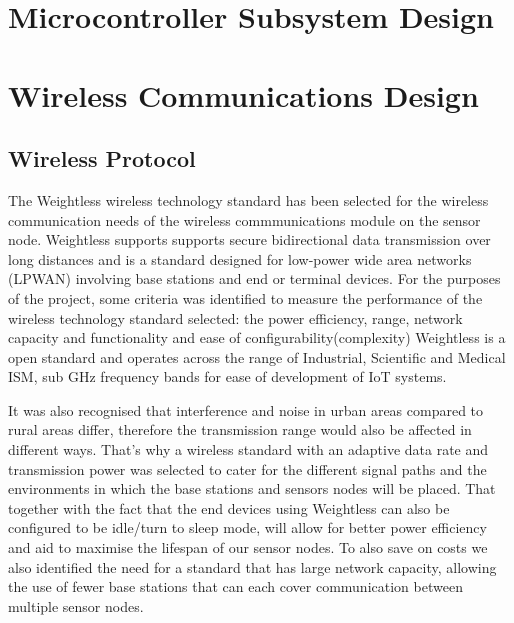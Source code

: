 \documentclass[12pt]{article}
\begin{document}
\section{Microcontroller Subsystem Design}

\section{Wireless Communications Design}

\subsection{Wireless Protocol}

The Weightless wireless technology standard has been selected for the wireless communication needs of the wireless commmunications module on the sensor node. Weightless supports supports secure bidirectional data transmission over long distances and is a standard designed for low-power wide area networks (LPWAN) involving base stations and end or terminal devices. For the purposes of the project, some criteria was identified to measure the performance of the wireless technology standard selected: the power efficiency, range, network capacity and  functionality and ease of configurability(complexity) Weightless is a open standard and operates across the range of Industrial, Scientific and Medical ISM, sub GHz  frequency bands for ease of development of IoT systems. 

It was also recognised that interference and noise in urban areas compared to rural areas differ, therefore the transmission range would also be affected in different ways. That's why a wireless standard with an adaptive data rate and transmission power was selected to cater for the different signal paths and the environments in which the base stations and sensors nodes will be placed. That together with the fact that the end devices using Weightless can also be configured to be idle/turn to sleep mode, will allow for better power efficiency and aid to maximise the lifespan of our sensor nodes. 
To also save on costs we also identified the need for a standard that has large network capacity, allowing the use of fewer base stations that can each cover communication between multiple sensor nodes.

\end{document}
